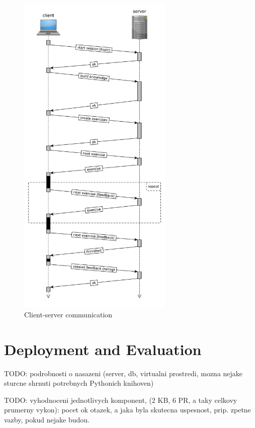 \documentclass[a4paper, 12pt, twoside]{fithesis2}		%
\renewcommand{\_}{\leavevmode \kern0.07em\vbox{\hrule width0.4em}}
\begin{document}
{\begin{figure}[h]
  \centering
  \includegraphics[width=0.66\textwidth]{images/client-server-communication.pdf}
  \caption{Client-server communication}
  \label{fig:client-server-communication}
\end{figure}


\chapter{Deployment and Evaluation}
\label{chap:evaluation}

TODO: podrobnosti o nasazeni (server, db, virtualni prostredi, mozna nejake sturcne shrnuti potrebnych Pythonich knihoven)

TODO: vyhodnoceni jednotlivych komponent, (2 KB, 6 PR, a taky celkovy prumerny vykon): pocet ok otazek, a jaka byla skutecna uspesnost, prip. zpetne vazby, pokud nejake budou.

}
\end{document}
